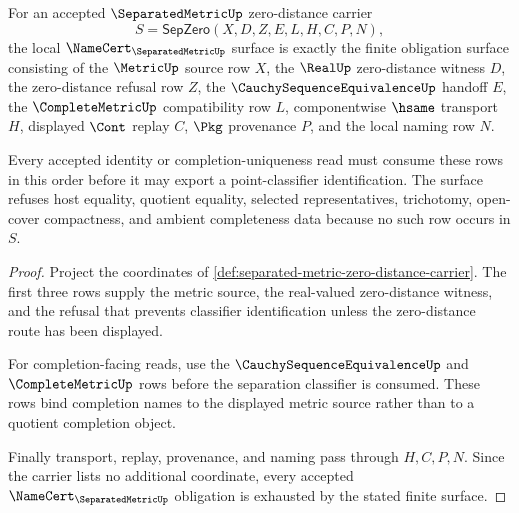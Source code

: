 \begin{theorem}
\label{thm:separated-metric-namecert-obligation-surface}
For an accepted $\SeparatedMetricUp$ zero-distance carrier
$$
S=\mathsf{SepZero}(X,D,Z,E,L,H,C,P,N),
$$
the local $\NameCert_{\SeparatedMetricUp}$ surface is exactly the finite obligation surface consisting of the $\MetricUp$ source row $X$, the $\RealUp$ zero-distance witness $D$, the zero-distance refusal row $Z$, the $\CauchySequenceEquivalenceUp$ handoff $E$, the $\CompleteMetricUp$ compatibility row $L$, componentwise $\hsame$ transport $H$, displayed $\Cont$ replay $C$, $\Pkg$ provenance $P$, and the local naming row $N$.

Every accepted identity or completion-uniqueness read must consume these rows in this order before it may export a point-classifier identification. The surface refuses host equality, quotient equality, selected representatives, trichotomy, open-cover compactness, and ambient completeness data because no such row occurs in $S$.
\end{theorem}
\begin{proof}
Project the coordinates of \autoref{def:separated-metric-zero-distance-carrier}. The first three rows supply the metric source, the real-valued zero-distance witness, and the refusal that prevents classifier identification unless the zero-distance route has been displayed.

For completion-facing reads, use the $\CauchySequenceEquivalenceUp$ and $\CompleteMetricUp$ rows before the separation classifier is consumed. These rows bind completion names to the displayed metric source rather than to a quotient completion object.

Finally transport, replay, provenance, and naming pass through $H,C,P,N$. Since the carrier lists no additional coordinate, every accepted $\NameCert_{\SeparatedMetricUp}$ obligation is exhausted by the stated finite surface.
\end{proof}


